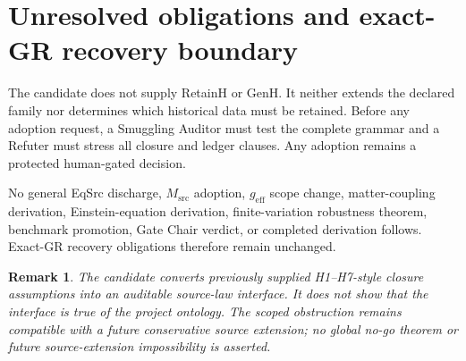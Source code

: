 \documentclass[11pt]{article}
\newtheorem{remark}{Remark}
\begin{document}
\section{Unresolved obligations and exact-GR recovery boundary}

The candidate does not supply RetainH or GenH. It neither extends the declared
family nor determines which historical data must be retained. Before any
adoption request, a Smuggling Auditor must test the complete grammar and a
Refuter must stress all closure and ledger clauses. Any adoption remains a
protected human-gated decision.

No general EqSrc discharge, $M_{\mathrm{src}}$ adoption, $g_{\mathrm{eff}}$
scope change, matter-coupling derivation, Einstein-equation derivation,
finite-variation robustness theorem, benchmark promotion, Gate Chair verdict,
or completed derivation follows. Exact-GR recovery obligations therefore
remain unchanged.

\begin{remark}
The candidate converts previously supplied H1--H7-style closure assumptions
into an auditable source-law interface. It does not show that the interface is
true of the project ontology. The scoped obstruction remains compatible with a
future conservative source extension; no global no-go theorem or future
source-extension impossibility is asserted.
\end{remark}
\end{document}
